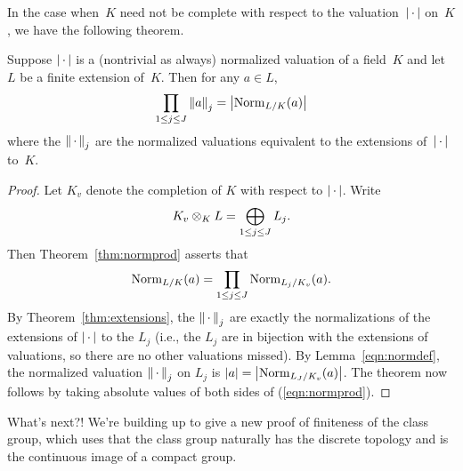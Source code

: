 In the case when~$K$ need not be complete with respect
to the valuation~$\left|\,\cdot\,\right|$ on~$K$, we have the following
theorem.
\begin{theorem}\label{thm:normprod}
Suppose $\left|\,\cdot\,\right|$ is a (nontrivial as always) normalized valuation
of a field~$K$ and let~$L$ be a finite extension of~$K$.
Then for any $a\in L$,
$$  
   \prod_{1\leq j \leq J} \left\|a\right\|_j = \left|\operatorname{Norm}_{L/K}(a)\right|
$$
where the $\left\|\,\cdot\,\right\|_j$ are the normalized valuations equivalent
to the extensions of~$\left|\,\cdot\,\right|$ to~$K$.
\end{theorem}
\begin{proof}
Let $K_v$ denote the completion of $K$ with respect to 
$\left|\,\cdot\,\right|$.  Write
$$
  K_v\otimes_K L = \bigoplus_{1\leq j \leq J} L_j.
$$
Then Theorem~\ref{thm:normprod} asserts that
\begin{equation}\label{eqn:normprod}
 \operatorname{Norm}_{L/K}(a) = \prod_{1\leq j\leq J} \operatorname{Norm}_{L_j/K_v}(a).
\end{equation}
By Theorem~\ref{thm:extensions}, the $\left\|\,\cdot\,\right\|_j$ are exactly the
normalizations of the extensions of $\left|\,\cdot\,\right|$ to the $L_j$ (i.e., the
$L_j$ are in bijection with the extensions of valuations, so there are
no other valuations missed).  By Lemma~\ref{eqn:normdef}, the
normalized valuation $\left\|\,\cdot\,\right\|_j$ on $L_j$ is $\left|a\right| =
\left|\operatorname{Norm}_{L_J/K_v}(a)\right|$.  The theorem now follows by taking absolute
values of both sides of (\ref{eqn:normprod}).
\end{proof}

What's next?!  We're building up to give a new proof of finiteness of
the class group, which uses that the class group naturally has the
discrete topology and is the continuous image of a compact group.


